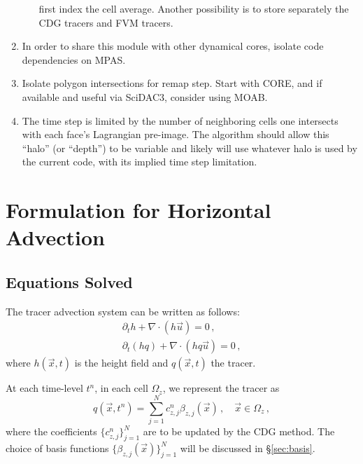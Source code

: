 \documentclass[11pt]{report}
\newcommand{\svec}[1]{{\Vec{#1}}}
\newcommand{\grad}[0]{\nabla}
\begin{document}
\begin{enumerate}
\begin{enumerate}
            first index the cell average.  Another possibility is to store
            separately the CDG tracers and FVM tracers.
          \end{enumerate}
	\item In order to share this module with other dynamical cores,
          isolate code dependencies on MPAS. \label{req:isolate}
        \item Isolate polygon intersections for remap step.  Start with CORE,
          and if available and useful via SciDAC3, consider using MOAB.
          \label{req:remap}
        \item The time step is limited by the number of neighboring cells one
          intersects with each face's Lagrangian pre-image.  The algorithm
          should allow this ``halo''
          (or ``depth'') to be variable and likely will use whatever halo is
          used by the current code, with its implied time step limitation.
          \label{req:halo}
\end{enumerate}

\chapter{Formulation for Horizontal Advection}

\section{Equations Solved}

The tracer advection system can be written as follows:
\begin{subequations}
\label{eq:tracer_system}
\begin{gather}
  \label{eq:rho}
  \partial_t h + \grad \cdot (h \svec{u}) = 0\,, \\
   \label{eq:tracer}
  \partial_t (h q) + \grad \cdot (h q \svec{u}) = 0\,,
\end{gather}
\end{subequations}
where $h(\svec{x},t)$ is the height field and $q(\svec{x},t)$ the tracer.

At each time-level $t^n$, in each cell $\Omega_z$, we represent the tracer as
\begin{equation}
  \label{eq:expanT}
   q(\svec{x},t^n) = \sum_{j=1}^{N} c^{n}_{z,j} \beta_{z,j}(\svec{x})
       \,, \quad \svec{x} \in \Omega_z\,,
\end{equation}
where the coefficients $\{c^{n}_{z,j}\}_{j=1}^N$ are to be updated by the CDG
method.  The choice of basis functions $\{\beta_{z,j}(\svec{x})\}_{j=1}^N$ will
  be discussed in \S\ref{sec:basis}.
\end{document}

